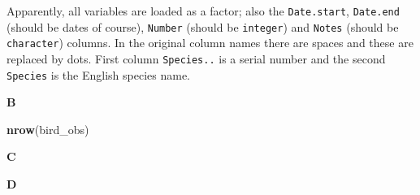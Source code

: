 \documentclass[]{book}
\newenvironment{Shaded}{\begin{snugshade}}{\end{snugshade}}
\newcommand{\DataTypeTok}[1]{\textcolor[rgb]{0.13,0.29,0.53}{#1}}
\newcommand{\DecValTok}[1]{\textcolor[rgb]{0.00,0.00,0.81}{#1}}
\newcommand{\KeywordTok}[1]{\textcolor[rgb]{0.13,0.29,0.53}{\textbf{#1}}}
\newcommand{\NormalTok}[1]{#1}
\newcommand{\OperatorTok}[1]{\textcolor[rgb]{0.81,0.36,0.00}{\textbf{#1}}}
\newcommand{\StringTok}[1]{\textcolor[rgb]{0.31,0.60,0.02}{#1}}
\begin{document}
Apparently, all variables are loaded as a factor; also the \texttt{Date.start}, \texttt{Date.end} (should be dates of course), \texttt{Number} (should be \texttt{integer}) and \texttt{Notes} (should be \texttt{character}) columns. In the original column names there are spaces and these are replaced by dots. First column \texttt{Species..} is a serial number and the second \texttt{Species} is the English species name.

\textbf{B}

\begin{Shaded}
\begin{Highlighting}[]
\KeywordTok{nrow}\NormalTok{(bird_obs)}
\end{Highlighting}
\end{Shaded}

\textbf{C}

\begin{Shaded}
\end{Shaded}

\textbf{D}

\begin{Shaded}
\end{Shaded}
\end{document}
